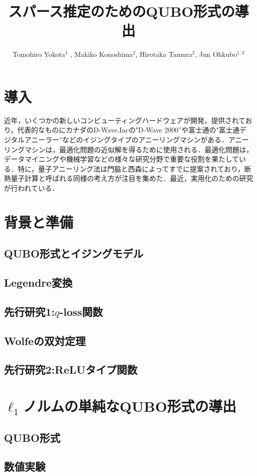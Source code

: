 \documentclass[fp,twocolumn]{jpsj3}
\title{スパース推定のためのQUBO形式の導出}
\author{Tomohiro Yokota$^1$%
  , Makiko Konoshima$^2$, Hirotaka Tamura$^2$, Jun Ohkubo$^{1,3}$}
\begin{document}
\maketitle

\section{導入}
近年，いくつかの新しいコンピューティングハードウェアが開発，提供されており，代表的なものにカナダのD-Wave.Incの"D-Wave 2000''や富士通の"富士通デジタルアニーラー''などのイジングタイプのアニーリングマシンがある．アニーリングマシンは，最適化問題の近似解を得るために使用される．最適化問題は，データマイニングや機械学習などの様々な研究分野で重要な役割を果たしている．特に，量子アニーリング法は門脇と西森によってすでに提案されており，断熱量子計算と呼ばれる同様の考え方が注目を集めた．最近，実用化のための研究が行われている．

\section{背景と準備}
\subsection{QUBO形式とイジングモデル}
\subsection{Legendre変換}
\subsection{先行研究1:$q$-loss関数}
\subsection{Wolfeの双対定理}
\subsection{先行研究2:ReLUタイプ関数}
\section{$\ell_{1}$ノルムの単純なQUBO形式の導出}
\subsection{QUBO形式}
\subsection{数値実験}
\end{document}
